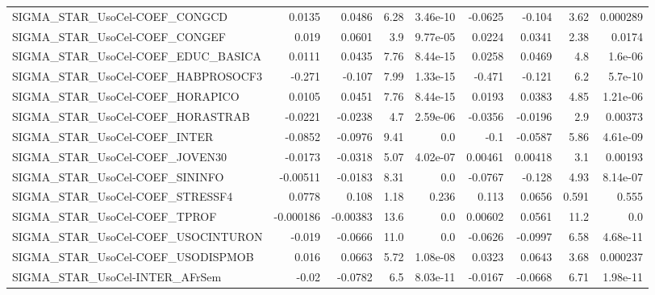 \begin{tabular}{lrrrrrrrr}
SIGMA\_STAR\_UsoCel-COEF\_CONGCD          &      0.0135 &       0.0486 &     6.28 & 3.46e-10 &    -0.0625 &      -0.104 &         3.62 &      0.000289 \\
SIGMA\_STAR\_UsoCel-COEF\_CONGEF          &       0.019 &       0.0601 &      3.9 & 9.77e-05 &     0.0224 &      0.0341 &         2.38 &        0.0174 \\
SIGMA\_STAR\_UsoCel-COEF\_EDUC\_BASICA     &      0.0111 &       0.0435 &     7.76 & 8.44e-15 &     0.0258 &      0.0469 &          4.8 &       1.6e-06 \\
SIGMA\_STAR\_UsoCel-COEF\_HABPROSOCF3     &      -0.271 &       -0.107 &     7.99 & 1.33e-15 &     -0.471 &      -0.121 &          6.2 &       5.7e-10 \\
SIGMA\_STAR\_UsoCel-COEF\_HORAPICO        &      0.0105 &       0.0451 &     7.76 & 8.44e-15 &     0.0193 &      0.0383 &         4.85 &      1.21e-06 \\
SIGMA\_STAR\_UsoCel-COEF\_HORASTRAB       &     -0.0221 &      -0.0238 &      4.7 & 2.59e-06 &    -0.0356 &     -0.0196 &          2.9 &       0.00373 \\
SIGMA\_STAR\_UsoCel-COEF\_INTER           &     -0.0852 &      -0.0976 &     9.41 &      0.0 &       -0.1 &     -0.0587 &         5.86 &      4.61e-09 \\
SIGMA\_STAR\_UsoCel-COEF\_JOVEN30         &     -0.0173 &      -0.0318 &     5.07 & 4.02e-07 &    0.00461 &     0.00418 &          3.1 &       0.00193 \\
SIGMA\_STAR\_UsoCel-COEF\_SININFO         &    -0.00511 &      -0.0183 &     8.31 &      0.0 &    -0.0767 &      -0.128 &         4.93 &      8.14e-07 \\
SIGMA\_STAR\_UsoCel-COEF\_STRESSF4        &      0.0778 &        0.108 &     1.18 &    0.236 &      0.113 &      0.0656 &        0.591 &         0.555 \\
SIGMA\_STAR\_UsoCel-COEF\_TPROF           &   -0.000186 &     -0.00383 &     13.6 &      0.0 &    0.00602 &      0.0561 &         11.2 &           0.0 \\
SIGMA\_STAR\_UsoCel-COEF\_USOCINTURON     &      -0.019 &      -0.0666 &     11.0 &      0.0 &    -0.0626 &     -0.0997 &         6.58 &      4.68e-11 \\
SIGMA\_STAR\_UsoCel-COEF\_USODISPMOB      &       0.016 &       0.0663 &     5.72 & 1.08e-08 &     0.0323 &      0.0643 &         3.68 &      0.000237 \\
SIGMA\_STAR\_UsoCel-INTER\_AFrSem         &       -0.02 &      -0.0782 &      6.5 & 8.03e-11 &    -0.0167 &     -0.0668 &         6.71 &      1.98e-11 \\

\end{tabular}
